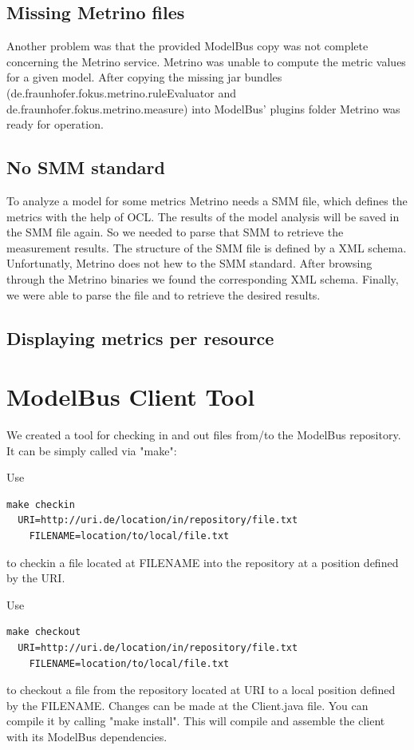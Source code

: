 \subsection{Missing Metrino files}
Another problem was that the provided ModelBus copy was not complete
concerning the Metrino service. Metrino was unable to compute the
metric values for a given model. After copying the missing jar bundles
(de.fraunhofer.fokus.metrino.ruleEvaluator and
de.fraunhofer.fokus.metrino.measure) into ModelBus' plugins folder
Metrino was ready for operation.

\subsection{No SMM standard}
To analyze a model for some metrics Metrino needs a SMM file, which
defines the metrics with the help of OCL. The results of the model
analysis will be saved in the SMM file again. So we needed to parse
that SMM to retrieve the measurement results. The structure of the SMM
file is defined by a XML schema. Unfortunatly, Metrino does not hew to
the SMM standard. After browsing through the Metrino binaries we found
the corresponding XML schema. Finally, we were able to parse the file
and to retrieve the desired results.

\subsection{Displaying metrics per resource}









\section{ModelBus Client Tool}
We created a tool for checking in and out files from/to the ModelBus repository. It can be simply called via "make":

Use
\begin{verbatim}
make checkin 
  URI=http://uri.de/location/in/repository/file.txt 
	FILENAME=location/to/local/file.txt
\end{verbatim}
to checkin a file located at FILENAME into the repository at a position defined by the URI.

Use
\begin{verbatim}
make checkout 
  URI=http://uri.de/location/in/repository/file.txt 
	FILENAME=location/to/local/file.txt
\end{verbatim}
to checkout a file from the repository located at URI to a local position defined by the FILENAME.
Changes can be made at the Client.java file. You can compile it by calling "make install". This will compile and assemble the client with its ModelBus dependencies.
